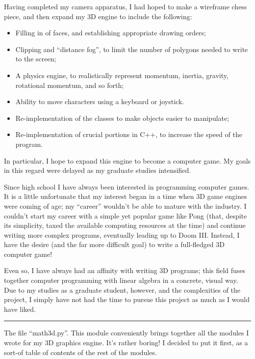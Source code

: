 \documentclass{article}
\newcommand{\sectionline}{
\begin{center}
   \rule{1in}{.01in}
\end{center}
}
\begin{document}
Having completed my camera apparatus, I had hoped to make a wireframe chess piece, and then expand my 3D engine to include the following:
\begin{itemize}
   \item Filling in of faces, and establishing appropriate drawing orders;

   \item Clipping and ``distance fog'', to limit the number of polygons needed to write to the screen;

   \item A physics engine, to realistically represent momentum, inertia, gravity, rotational momentum, and so forth;

   \item Ability to move characters using a keyboard or joystick.

   \item Re-implementation of the classes to make objects easier to manipulate;

   \item Re-implementation of crucial portions in C++, to increase the speed of the program.
\end{itemize}
In particular, I hope to expand this engine to become a computer game.  My goals in this regard were delayed as my graduate studies intensified.

Since high school I have always been interested in programming computer games.  It is a little unfortunate that my interest began in a time when 3D game engines were coming of age; my ``career'' wouldn't be able to mature with the industry.  I couldn't start my career with a simple yet popular game like Pong (that, despite its simplicity, taxed the available computing resources at the time) and continue writing more complex programs, eventually leading up to Doom III.  Instead, I have the desire (and the far more difficult goal) to write a full-fledged 3D computer game!

Even so, I have always had an affinity with writing 3D programs; this field fuses together computer programming with linear algebra in a concrete, visual way.  Due to my studies as a graduate student, however, and the complexities of the project, I simply have not had the time to pursue this project as much as I would have liked.


\sectionline

The file ``math3d.py''.  This module conveniently brings together all the modules I wrote for my 3D graphics engine.  It's rather boring!  I decided to put it first, as a sort-of table of contents of the rest of the modules.
\end{document}
